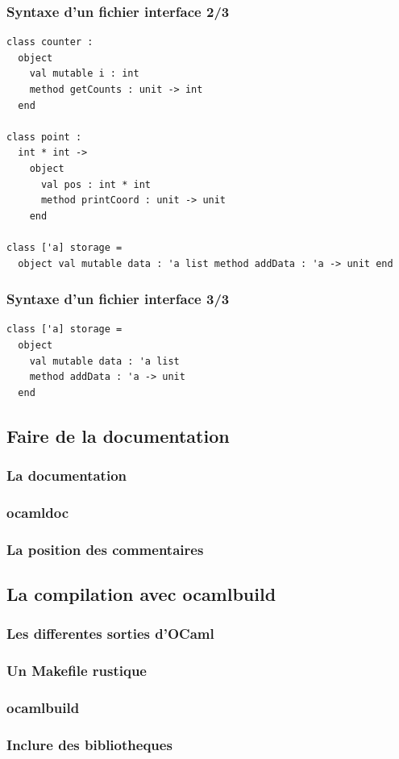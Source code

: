 \begin{frame}[fragile]
	\frametitle{Syntaxe d'un fichier interface 2/3}
	\lstset{basicstyle=\small}
	\begin{lstlisting}
class counter :
  object
    val mutable i : int
    method getCounts : unit -> int
  end

class point :
  int * int -> 
    object
      val pos : int * int
      method printCoord : unit -> unit
    end

class ['a] storage = 
  object val mutable data : 'a list method addData : 'a -> unit end
	\end{lstlisting}
\end{frame}

\begin{frame}[fragile]
	\frametitle{Syntaxe d'un fichier interface 3/3}
	\lstset{basicstyle=\small}
	\begin{lstlisting}
class ['a] storage = 
  object 
    val mutable data : 'a list
    method addData : 'a -> unit 
  end
	\end{lstlisting}
\end{frame}


\subsection{Faire de la documentation} %
\begin{frame}
	\frametitle{La documentation}

\end{frame}

\begin{frame}
	\frametitle{ocamldoc}

\end{frame}

\begin{frame}
	\frametitle{La position des commentaires}

\end{frame}

\subsection{La compilation avec ocamlbuild} %
\begin{frame}
	\frametitle{Les differentes sorties d'OCaml}

\end{frame}

\begin{frame}
	\frametitle{Un Makefile rustique}

\end{frame}

\begin{frame}
	\frametitle{ocamlbuild}

\end{frame}

\begin{frame}
	\frametitle{Inclure des bibliotheques}

\end{frame}

